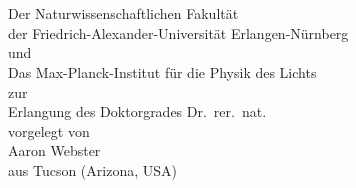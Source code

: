 \begin{titlepage}
\begin{center}
\hfill\\[2cm]
{\Huge {\bfseries \textsc {\distitle}} \par}
\vspace{12.0cm}
\\
{\large
Der Naturwissenschaftlichen Fakultät\\
der Friedrich-Alexander-Universität Erlangen-Nürnberg\\
und\\
Das Max-Planck-Institut für die Physik des Lichts\\
\vspace{0.5cm}
zur\\
Erlangung des Doktorgrades Dr.\ rer.\ nat.\ \\
\vspace{0.5cm}
vorgelegt von\\
Aaron Webster\\
aus Tucson (Arizona, USA)
}
\end{center}
\tikzexternaldisable{}
\tikzexternalenable{}
\end{titlepage}
